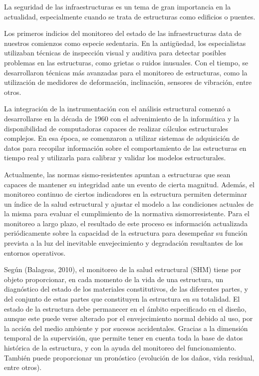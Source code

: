 La seguridad de las infraestructuras es un tema de gran importancia en la actualidad, especialmente cuando se trata de estructuras como edificios o puentes.

Los primeros indicios del monitoreo del estado de las infraestructuras data de nuestros comienzos como especie sedentaria.  En la antigüedad, los especialistas utilizaban técnicas de inspección visual y auditiva para detectar posibles problemas en las estructuras, como grietas o ruidos inusuales. Con el tiempo, se desarrollaron técnicas más avanzadas para el monitoreo de estructuras, como la utilización de medidores de deformación, inclinación, sensores de vibración, entre otros.

La integración de la instrumentación con el análisis estructural comenzó a desarrollarse en la década de 1960 con el advenimiento de la informática y la disponibilidad de computadoras capaces de realizar cálculos estructurales complejos. En esa época, se comenzaron a utilizar sistemas de adquisición de datos para recopilar información sobre el comportamiento de las estructuras en tiempo real y utilizarla para calibrar y validar los modelos estructurales.

Actualmente, las normas sismo-resistentes apuntan a estructuras que sean capaces de mantener su integridad ante un evento de cierta magnitud. Además, el monitoreo continuo de ciertos indicadores en la estructura permiten determinar un índice de la salud estructural y ajustar el modelo a las condiciones actuales de la misma para evaluar el cumplimiento de la normativa sismorresistente. Para el monitoreo a largo plazo, el resultado de este proceso es información actualizada periódicamente sobre la capacidad de la estructura para desempeñar su función prevista a la luz del inevitable envejecimiento y degradación resultantes de los entornos operativos.

Según \citep{balageas2010structural} (Balageas, 2010), el monitoreo de la salud estructural (SHM) tiene por objeto proporcionar, en cada momento de la vida de una estructura, un diagnóstico del estado de los materiales constitutivos, de las diferentes
partes, y del conjunto de estas partes que constituyen la estructura en su totalidad. El estado de la estructura debe permanecer en el ámbito especificado en el diseño, aunque este puede verse alterado por el envejecimiento normal debido al uso, por la acción del medio ambiente y por sucesos accidentales. Gracias a la dimensión temporal de la supervisión, que permite tener en cuenta toda la base de datos histórica de la estructura, y con la ayuda del monitoreo del funcionamiento. También puede proporcionar un pronóstico (evolución de los daños, vida residual, entre otros).

